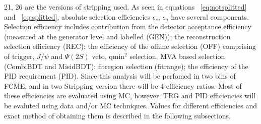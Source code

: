 
21, 26 are the versions of stripping used.
As seen in equations ~\ref{eq:notsplitted} and ~\ref{eq:splitted}, absolute selection efficiencies $\epsilon_{s}$, $\epsilon_{n}$ have several components.
\newline Selection efficiency includes contribution from the detector acceptance efficiency (measured at the generator level and labelled (GEN));
the reconstruction selection efficiency (REC); the efficiency of the offline selection (OFF) comprising of trigger, $J/\psi$ and $\Psi(2S)$ veto, qmin$^{2}$ selection, MVA based selection (CombiBDT and MisidBDT); fitregion selection (fitrange); the efficiency of the PID requirement (PID). Since this analysis will be perfomed in two bins of FCME, and in two Stripping version there will be 4 efficiency ratios.  Most of these efficiencies are evaluated using MC, however, TRG and PID efficiencies will be evaluted using data and/or MC techniques. Values for different efficiencies and exact method of obtaining them is described in the following subsections.







